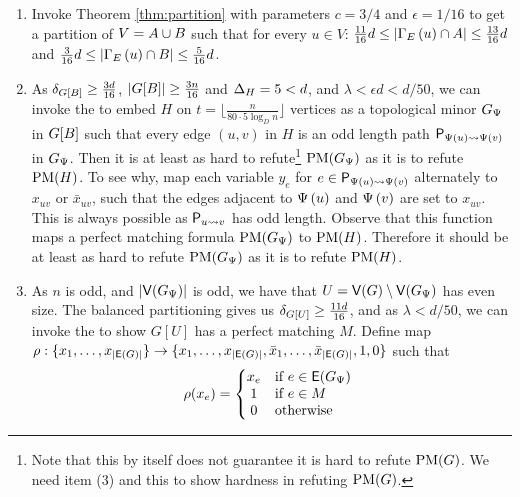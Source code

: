 \documentclass[11pt]{article}
\begin{document}
\begin{enumerate}
\item{Invoke Theorem \ref{thm:partition} with parameters $c=3/4$ and $\epsilon = 1/16$ to get a partition of $V = A \cup B$ such that for every $u \in V$: $\frac{11}{16}d  \leq   |\Gamma_{E}\left(u\right) \cap A| \leq \frac{13}{16}d$ and $\frac{3}{16}d  \leq   |\Gamma_{E}\left(u\right) \cap B| \leq \frac{5}{16}d$.}

\item{As $\delta_{G[B]} \geq \frac{3d}{16}$, $|G[B]| \geq \frac{3n}{16}$ and $\Delta_{H} = 5 < d$, and $\lambda < \epsilon d < d/50$, we can invoke the   to embed $H$ on $t = \lfloor \frac{ n}{80\cdot 5\log_Dn}\rfloor $ vertices as a topological minor $G_{\Psi}$ in $G[B]$ such that every edge $(u,v)$ in $H$ is an odd length path $\mathsf{P}_{\Psi\left(u\right) \rightsquigarrow \Psi\left(v\right) }$ in $G_{\Psi}$.
    Then it is at least as hard to refute\footnote{Note that this by itself does not guarantee it is hard to refute $\text{PM}(G)$. We need item (3) and this to show hardness in refuting $\text{PM}(G)$.} $\text{PM}(G_{\Psi})$ as it is to refute $\text{PM}(H)$.
    To see why, map each variable $y_e$ for $e \in \mathsf{P}_{\Psi\left(u\right) \rightsquigarrow \Psi\left(v\right) }$ alternately to $x_{uv}$ or $\bar{x}_{uv}$, such that the edges adjacent to $\Psi\left(u\right)$ and $\Psi\left(v\right)$ are set to $x_{uv}$. This is always possible as $\mathsf{P}_{u \rightsquigarrow v }$ has odd length.
    Observe that this function maps a perfect matching formula  $\text{PM}(G_{\Psi})$ to $\text{PM}(H)$.
    Therefore it should be at least as hard to refute $\text{PM}(G_{\Psi})$ as it is to refute $\text{PM}(H)$.
  }

\item{ As $n$ is odd, and $|\mathsf{V}(G_{\Psi})|$ is odd, we have that $U = \mathsf{V}(G) \setminus \mathsf{V}(G_{\Psi})$ has even size.
    The balanced partitioning gives us $\delta_{G[U]} \geq \frac{11d}{16}$, and as $\lambda < d/50$, we can invoke the  to show $G[U]$ has a perfect matching $M$.
    Define map $\rho: \{x_1, \dots, x_{|\mathsf{E}(G)|}\} \rightarrow \{x_1, \dots, x_{|\mathsf{E}(G)|}, \bar{x}_1, \dots, \bar{x}_{|\mathsf{E}(G)|}, 1, 0 \}$ such that
\[
\rho(x_e) =
\left\{
\begin{array}{@{}cl}
x_e & \text{if } e \in \Edges{G_{\EmbeddingFunc}} \\
1 & \text{if } e \in M \\
0 & \text{otherwise}
\end{array}
\right.
\]

}
\end{enumerate}
\end{document}
